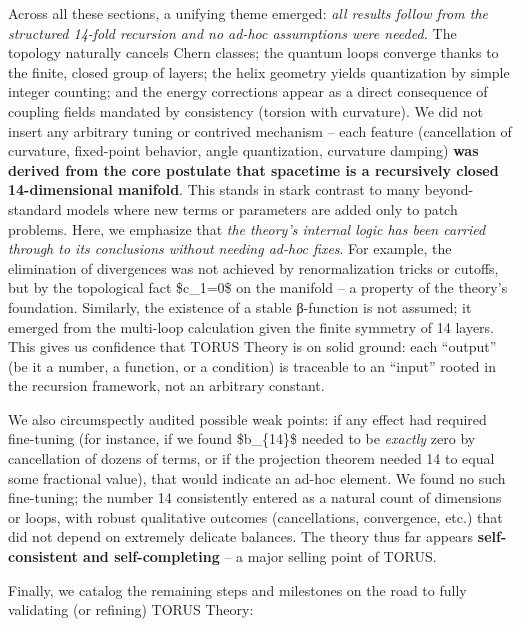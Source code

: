 \documentclass[]{article}
\begin{document}
Across all these sections, a unifying theme emerged: \emph{all results
follow from the structured 14-fold recursion and no ad-hoc assumptions
were needed.} The topology naturally cancels Chern classes; the quantum
loops converge thanks to the finite, closed group of layers; the helix
geometry yields quantization by simple integer counting; and the energy
corrections appear as a direct consequence of coupling fields mandated
by consistency (torsion with curvature). We did not insert any arbitrary
tuning or contrived mechanism -- each feature (cancellation of
curvature, fixed-point behavior, angle quantization, curvature damping)
\textbf{was derived from the core postulate that spacetime is a
recursively closed 14-dimensional manifold}. This stands in stark
contrast to many beyond-standard models where new terms or parameters
are added only to patch problems. Here, we emphasize that \emph{the
theory's internal logic has been carried through to its conclusions
without needing ad-hoc fixes}. For example, the elimination of
divergences was not achieved by renormalization tricks or cutoffs, but
by the topological fact \$c\_1=0\$ on the manifold -- a property of the
theory's foundation. Similarly, the existence of a stable β-function is
not assumed; it emerged from the multi-loop calculation given the finite
symmetry of 14 layers. This gives us confidence that TORUS Theory is on
solid ground: each ``output'' (be it a number, a function, or a
condition) is traceable to an ``input'' rooted in the recursion
framework, not an arbitrary constant.

We also circumspectly audited possible weak points: if any effect had
required fine-tuning (for instance, if we found \$b\_\{14\}\$ needed to
be \emph{exactly} zero by cancellation of dozens of terms, or if the
projection theorem needed 14 to equal some fractional value), that would
indicate an ad-hoc element. We found no such fine-tuning; the number 14
consistently entered as a natural count of dimensions or loops, with
robust qualitative outcomes (cancellations, convergence, etc.) that did
not depend on extremely delicate balances. The theory thus far appears
\textbf{self-consistent and self-completing} -- a major selling point of
TORUS.

Finally, we catalog the remaining steps and milestones on the road to
fully validating (or refining) TORUS Theory:
\end{document}

